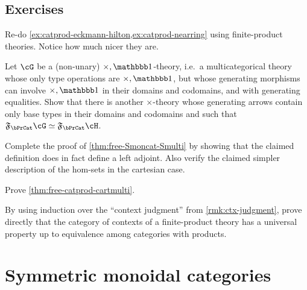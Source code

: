 \subsection*{Exercises}

\begin{ex}\label{ex:catprod-ehnr-again}
  Re-do \cref{ex:catprod-eckmann-hilton,ex:catprod-nearring} using finite-product theories.
  Notice how much nicer they are.
\end{ex}

\begin{ex}\label{ex:catprod-thy-noprod}
  Let $\cG$ be a (non-unary) $\times,\unit$-theory, i.e.\ a multicategorical theory whose only type operations are $\times,\unit$, but whose generating morphisms can involve $\times,\unit$ in their domains and codomains, and with generating equalities.
  Show that there is another $\times$-theory \cH whose generating arrows contain only base types in their domains and codomains and such that $\F\bPrCat\cG\simeq \F\bPrCat\cH$.
\end{ex}

\begin{ex}\label{ex:free-Smoncat-Smulti}
  Complete the proof of \cref{thm:free-Smoncat-Smulti} by showing that the claimed definition does in fact define a left adjoint.
  Also verify the claimed simpler description of the hom-sets in the cartesian case.
\end{ex}

\begin{ex}\label{ex:free-catprod-cartmulti}
  Prove \cref{thm:free-catprod-cartmulti}.
\end{ex}

\begin{ex}\label{ex:catctx-ctxjdg}
  By using induction over the ``context judgment'' from \cref{rmk:ctx-judgment}, prove directly that the category of contexts of a finite-product theory has a universal property up to equivalence among categories with products.
\end{ex}




\section{Symmetric monoidal categories}
\label{sec:symmoncat}

